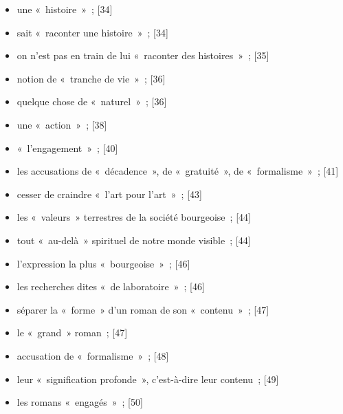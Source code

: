 \documentclass[12pt, a4paper]{article}
\begin{document}
\begin{itemize}
    \item une «~histoire~»{\color{gray}~; [34]}

    \item sait «~raconter une histoire~»{\color{gray}~; [34]}

    \item on n’est pas en train de lui «~raconter des histoires~»{\color{gray}~; [35]}

    \item notion de «~tranche de vie~»{\color{gray}~; [36]}

    \item quelque chose de «~naturel~»{\color{gray}~; [36]}

    \item une «~action~»{\color{gray}~; [38]}

    \item «~l’engagement~»{\color{gray}~; [40]}

    \item les accusations de «~décadence~», de «~gratuité~», de «~formalisme~»{\color{gray}~; [41]}

    \item cesser de craindre «~l’art pour l’art~»{\color{gray}~; [43]}

    \item les «~valeurs~» terrestres de la société bourgeoise{\color{gray}~; [44]}

    \item tout «~au-delà~» spirituel de notre monde visible{\color{gray}~; [44]}

    \item l’expression la plus «~bourgeoise~»{\color{gray}~; [46]}

    \item les recherches dites «~de laboratoire~»{\color{gray}~; [46]}

    \item séparer la «~forme~» d’un roman de son «~contenu~»{\color{gray}~; [47]}

    \item le «~grand~» roman{\color{gray}~; [47]}

    \item accusation de «~formalisme~»{\color{gray}~; [48]}

    \item leur «~signification profonde~», c’est-à-dire leur contenu{\color{gray}~; [49]}

    \item les romans «~engagés~»{\color{gray}~; [50]}


\end{itemize}
\end{document}

